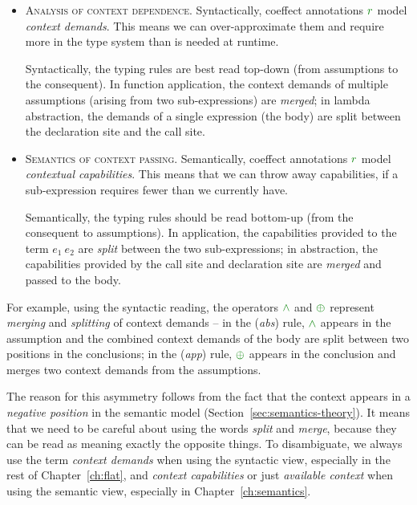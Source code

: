 \begin{itemize}
\item \textsc{Analysis of context dependence.}
Syntactically, coeffect annotations $\cclrd{r}$ model \emph{context demands}. This means
we can over-approximate them and require more in the type system than is needed at runtime.

Syntactically, the typing rules are best read top-down (from assumptions to the consequent).
In function application, the context demands of multiple assumptions (arising from two
sub-expressions) are \emph{merged}; in lambda abstraction, the demands of a single expression
(the body) are split between the declaration site and the call site.

\item \textsc{Semantics of context passing.}
Semantically, coeffect annotations $\cclrd{r}$ mo\-del \emph{contextual capabilities}. This means
that we can throw away capabilities, if a sub-expression requires fewer than we
currently have.

Semantically, the typing rules should be read bottom-up (from the consequent to assumptions).
In application, the capabilities provided to the term $e_1~e_2$ are \emph{split} between the
two sub-expressions; in abstraction, the capabilities provided by the call site and declaration
site are \emph{merged} and passed to the body.
\end{itemize}

\noindent
For example, using the syntactic reading, the operators $\czip$ and $\cpar$ represent \emph{merging}
and \emph{splitting} of context demands -- in the (\emph{abs}) rule, $\czip$ appears in the assumption
and the combined context demands of the body are split between two positions in the conclusions;
in the (\emph{app}) rule, $\cpar$ appears in the conclusion and merges two context demands
from the assumptions.

The reason for this asymmetry follows from the fact that the context appears in a \emph{negative
position} in the semantic model (Section~\ref{sec:semantics-theory}). It means that we need to be
careful about using the words \emph{split} and \emph{merge}, because they can be read as meaning
exactly the opposite things. To disambiguate, we always use the term \emph{context demands}
when using the syntactic view, especially in the rest of Chapter~\ref{ch:flat}, and
\emph{context capabilities} or just \emph{available context} when using the semantic view,
especially in Chapter~\ref{ch:semantics}.

